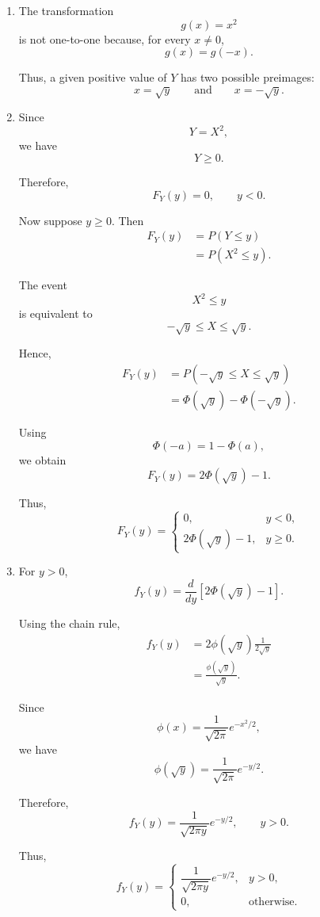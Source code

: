 \documentclass[11pt]{article}
\newenvironment{solution}{
    \par
    \begin{tcolorbox}[
        colback=white,
        colframe=uwgold,
        boxrule=0.7pt,
        arc=2mm,
        left=3mm,
        right=3mm,
        top=2mm,
        bottom=2mm,
        breakable,
        before skip=0.5em,
        after skip=1em,
        title=\textbf{Solution},
        coltitle=uwpurple,
        fonttitle=\bfseries
    ]
}{
    \end{tcolorbox}
}
\begin{document}
\begin{solution}

\begin{enumerate}[label=(\alph*)]

\item The transformation
\[
g(x)=x^2
\]
is not one-to-one because, for every \(x\neq0\),
\[
g(x)=g(-x).
\]


Thus, a given positive value of \(Y\) has two possible preimages:
\[
x=\sqrt y
\qquad\text{and}\qquad
x=-\sqrt y.
\]

\item Since
\[
Y=X^2,
\]
we have
\[
Y\geq0.
\]

Therefore,
\[
F_Y(y)=0,
\qquad y<0.
\]

Now suppose \(y\geq0\). Then
\[
\begin{aligned}
F_Y(y)
&=
P(Y\leq y)\\
&=
P(X^2\leq y).
\end{aligned}
\]

The event
\[
X^2\leq y
\]
is equivalent to
\[
-\sqrt y\leq X\leq\sqrt y.
\]

Hence,
\[
\begin{aligned}
F_Y(y)
&=
P(-\sqrt y\leq X\leq\sqrt y)\\
&=
\Phi(\sqrt y)-\Phi(-\sqrt y).
\end{aligned}
\]

Using
\[
\Phi(-a)=1-\Phi(a),
\]
we obtain
\[
F_Y(y)
=
2\Phi(\sqrt y)-1.
\]

Thus,
\[
F_Y(y)
=
\begin{cases}
0, & y<0,\\[1mm]
2\Phi(\sqrt y)-1, & y\geq0.
\end{cases}
\]

\item For \(y>0\),
\[
f_Y(y)
=
\frac{d}{dy}
\left[
2\Phi(\sqrt y)-1
\right].
\]

Using the chain rule,
\[
\begin{aligned}
f_Y(y)
&=
2\phi(\sqrt y)
\frac{1}{2\sqrt y}\\
&=
\frac{\phi(\sqrt y)}{\sqrt y}.
\end{aligned}
\]

Since
\[
\phi(x)
=
\frac1{\sqrt{2\pi}}
e^{-x^2/2},
\]
we have
\[
\phi(\sqrt y)
=
\frac1{\sqrt{2\pi}}
e^{-y/2}.
\]

Therefore,
\[
f_Y(y)
=
\frac{1}{\sqrt{2\pi y}}
e^{-y/2},
\qquad y>0.
\]

Thus,
\[
f_Y(y)
=
\begin{cases}
\dfrac{1}{\sqrt{2\pi y}}e^{-y/2},
&
y>0,\\[2mm]
0,
&
\text{otherwise}.
\end{cases}
\]

\end{enumerate}

\end{solution}
\end{document}
